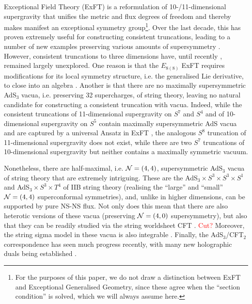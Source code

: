 \documentclass[a4paper, 11pt]{article}
\numberwithin{equation}{section}
\newcommand{\EE}{\ensuremath{E_{8(8)}}\xspace}
\newcommand{\+}{\oplus}
\newcommand{\EM}[1]{\textcolor{red}{#1}}
\begin{document}
Exceptional Field Theory (ExFT) is a reformulation of 10-/11-dimensional supergravity that unifies the metric and flux degrees of freedom and thereby makes manifest an exceptional symmetry group\footnote{For the purposes of this paper, we do not draw a distinction between ExFT and Exceptional Generalised Geometry, since these agree when the ``section condition'' is solved, which we will always assume here.}. Over the last decade, this has proven extremely useful for constructing consistent truncations, leading to a number of new examples preserving various amounts of supersymmetry \cite{Hohm:2014qga,Lee:2014mla,Malek:2015hma,Baguet:2015sma,Baguet:2015iou,Lee:2015xga,Malek:2016bpu,Ciceri:2016dmd,Cassani:2016ncu,Inverso:2016eet,Malek:2017cle,Malek:2017njj,Malek:2018zcz,Malek:2019ucd,Cassani:2019vcl,Malek:2020jsa,Cassani:2020cod}. However, consistent truncations to three dimensions have, until recently \cite{Galli:2022idq}, remained largely unexplored. One reason is that the $\EE$ ExFT requires modifications for its local symmetry structure, i.e. the generalised Lie derivative, to close into an algebra \cite{Hohm:2014fxa,Cederwall:2015ica}. Another is that there are no maximally supersymmetric AdS$_3$ vacua, i.e. preserving 32 supercharges, of string theory, leaving no natural candidate for constructing a consistent truncation with vacua. Indeed, while the consistent truncations of 11-dimensional supergravity on $S^7$ and $S^4$ and of 10-dimensional supergravity on $S^5$ contain maximally supersymmetric AdS vacua and are captured by a universal Ansatz in ExFT \cite{Hohm:2014qga,Lee:2014mla}, the analogous $S^8$ truncation of 11-dimensional supergravity does not exist, while there are two $S^7$ truncations of 10-dimensional supergravity but neither contains a maximally symmetric vacuum\cite{Fischbacher:2003yw,Galli:2022idq}.

Nonetheless, there are half-maximal, i.e. ${\cal N}=(4,4)$, supersymmetric AdS$_3$ vacua of string theory that are extremely intriguing. These are the AdS$_3 \times S^3 \times S^3 \times S^1$ and AdS$_3 \times S^3 \times T^4$ of IIB string theory (realising the ``large'' and ``small'' ${\cal N}=(4,4)$ superconformal symmetries), and, unlike in higher dimensions, can be supported by pure NS-NS flux. Not only does this mean that there are also heterotic versions of these vacua (preserving ${\cal N}=(4,0)$ supersymmetry), but also that they can be readily studied via the string worldsheet CFT \cite{Maldacena:2000hw,Eberhardt:2018ouy,Eberhardt:2019niq,Eberhardt:2019ywk}. \EM{Cut?} Moreover, the string sigma model in these vacua is also integrable \cite{}. Finally, the AdS$_3$/CFT$_2$ correspondence has seen much progress recently, with many new holographic duals being established \cite{}.
\end{document}

